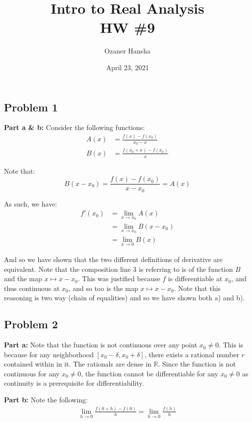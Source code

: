 \documentclass{article}
\newcommand{\R}{\mathbb R}
\newcommand{\Q}{\mathbb Q}
\begin{document}
\title{Intro to Real Analysis\\HW \#9}
\author{Ozaner Hansha}
\date{April 23, 2021}
\maketitle

\subsection*{Problem 1}
\noindent\textbf{Part a \& b:} Consider the following functions:
\begin{align*}
  A(x)&=\frac{f(x)-f(x_0)}{x_0-x}\\
  B(x)&=\frac{f(x_0+x)-f(x_0)}{x}
\end{align*}

Note that:
$$B(x-x_0)=\frac{f(x)-f(x_0)}{x-x_0}=A(x)$$

As such, we have:
\begin{align*}
  f'(x_0)&=\lim_{x\to x_0}A(x)\tag{def. of derivative}\\
  &=\lim_{x\to x_0}B(x-x_0)\tag{$A(x)=B(x-x_0)$}\\
  &=\lim_{x\to0}B(x)\tag{composition of continuous limits}
\end{align*}

And so we have shown that the two different definitions of derivative are equivalent. Note that the composition line 3 is referring to is of the function $B$ and the map $x\mapsto x-x_0$. This was justified because $f$ is differentiable at $x_0$, and thus continuous at $x_0$, and so too is the map $x\mapsto x-x_0$. Note that this reasoning is two way (chain of equalities) and so we have shown both a) and b).

\subsection*{Problem 2}
\noindent\textbf{Part a:} Note that the function is not continuous over any point $x_0\not=0$. This is because for any neighborhood $[x_0-\delta,x_0+\delta]$, there exists a rational number $r$ contained within in it. The rationals are dense in $\R$. Since the function is not continuous for any $x_0\not=0$, the function cannot be differentiable for any $x_0\not=0$ as continuity is a prerequisite for differentiability.
\bigskip

\noindent\textbf{Part b:} Note the following:
\begin{align*}
  \lim_{h\to0}\frac{f(0+h)-f(0)}{h}=\lim_{h\to0}\frac{f(h)}{h}\tag{$0\in\Q\implies f(0)=0^2=0$}
\end{align*}
\end{document}
